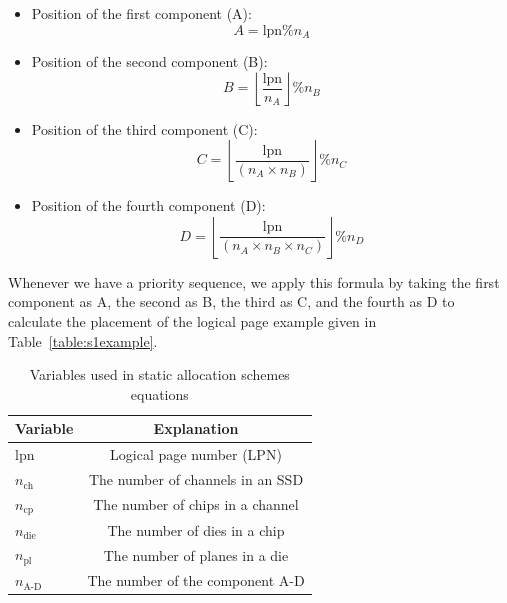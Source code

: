 \documentclass{ieeeaccess}
\begin{document}
\begin{itemize}
    \item {Position of the first component (A)}:
    \[
    A = \text{lpn} \% n_A
    \]
    \item {Position of the second component (B)}:
    \[
    B = \left\lfloor \frac{\text{lpn}}{n_A} \right\rfloor \% n_B
    \]
    \item {Position of the third component (C)}:
    \[
    C = \left\lfloor \frac{\text{lpn}}{(n_A \times n_B)} \right\rfloor \% n_C
    \]
    \item {Position of the fourth component (D)}:
    \[
    D = \left\lfloor \frac{\text{lpn}}{(n_A \times n_B \times n_C)} \right\rfloor \% n_D
    \]
\end{itemize}

Whenever we have a priority sequence, we apply this formula by taking the first component as A, the second as B, the third as C, and the fourth as D to calculate the placement of the logical page example given in Table~\ref{table:s1example}.

\begin{table}
    \centering
    \caption{Variables used in static allocation schemes equations}
    \label{table:variables_explanation}
    \begin{tabular}{|l|c|}
        \hline
        \textbf{Variable} & \textbf{Explanation} \\
        \hline
        lpn & Logical page number (LPN)  \\
        \hline
        $n_{\text{ch}}$ & The number of channels in an SSD \\
        \hline
        $n_{\text{cp}}$ & The number of chips in a channel \\
        \hline
        $n_{\text{die}}$ & The number of dies in a chip \\
        \hline
        $n_{\text{pl}}$ & The number of planes in a die \\
        \hline
        $n_{\text{A-D}}$ & The number of the component A-D \\
        \hline
    \end{tabular}
\end{table}
\end{document}
